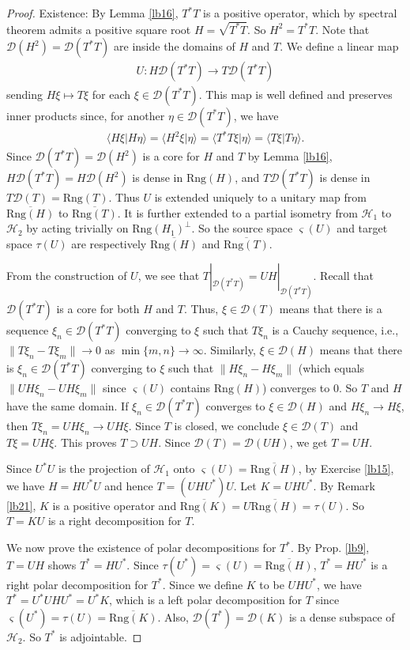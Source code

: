 \documentclass[12pt,a4paper,notitlepage]{article}
\theoremstyle{definition}
\theoremstyle{plain}
\newcommand{\mc}{\mathcal}
\newcommand{\ovl}{\overline}
\newcommand{\Dom}{\scr D}
\newcommand{\bk}[1]{\langle {#1}\rangle}
\newcommand{\scr}{\mathscr}
\newcommand{\sgm}{\varsigma}
\newcommand{\Rng}{\mathrm{Rng}}
\numberwithin{equation}{section}
\begin{document}
\begin{proof}
Existence: By Lemma \ref{lb16}, $T^*T$ is a positive operator,  which by spectral theorem admits a positive square root $H=\sqrt{T^*T}$. So $H^2=T^*T$. Note that $\Dom(H^2)=\Dom(T^*T)$ are inside the domains of $H$ and $T$. We define a linear map
\begin{align*}
U:H\Dom(T^*T)\rightarrow T\Dom(T^*T)	
\end{align*}
sending $H\xi\mapsto T\xi$ for each $\xi\in\Dom(T^*T)$. This map is well defined and preserves inner products since, for another $\eta\in\Dom(T^*T)$, we have
\begin{align*}
\bk{H\xi|H\eta}=\bk{H^2\xi|\eta}=\bk{T^*T\xi|\eta}=\bk{T\xi|T\eta}.	
\end{align*}
Since $\Dom(T^*T)=\Dom(H^2)$ is a core for $H$ and $T$ by Lemma \ref{lb16}, $H\Dom(T^*T)=H\Dom(H^2)$ is dense in $\Rng(H)$, and $T\Dom(T^*T)$ is dense in $T\Dom(T)=\Rng(T)$. Thus $U$ is extended uniquely to a unitary map from $\ovl{\Rng(H)}$ to $\ovl{\Rng(T)}$.	It is further extended to a partial isometry from $\mc H_1$ to $\mc H_2$ by acting trivially on $\Rng(H_1)^\perp$. So the source space $\sgm(U)$ and target space $\tau(U)$ are respectively $\ovl{\Rng(H)}$ and $\ovl{\Rng(T)}$.

From  the construction of $U$, we see that $T|_{\Dom(T^*T)}=UH|_{\Dom(T^*T)}$. Recall that $\Dom(T^*T)$ is a core for both $H$ and $T$. Thus, $\xi\in\Dom(T)$ means that there is a sequence $\xi_n\in\Dom(T^*T)$ converging to $\xi$ such that $T\xi_n$ is a Cauchy sequence, i.e., $\lVert T\xi_n-T\xi_m\lVert\rightarrow 0$ as $\min\{m,n\}\rightarrow \infty$. Similarly, $\xi\in\Dom(H)$ means that there is $\xi_n\in\Dom(T^*T)$ converging to $\xi$ such that $\lVert H\xi_n-H\xi_m\lVert$ (which equals $\lVert UH\xi_n-UH\xi_m\lVert$ since $\sgm(U)$ contains $\Rng(H)$) converges to $0$. So $T$ and $H$ have the same domain. If $\xi_n\in\Dom(T^*T)$ converges to $\xi\in\Dom(H)$ and $H\xi_n\rightarrow H\xi$, then $T\xi_n=UH\xi_n\rightarrow UH\xi$. Since $T$ is closed, we conclude $\xi\in\Dom(T)$ and $T\xi=UH\xi$. This proves $T\supset UH$. Since $\Dom(T)=\Dom(UH)$, we get $T=UH$.

Since $U^*U$ is the projection of $\mc H_1$ onto $\sgm(U)=\ovl{\Rng(H)}$, by Exercise \ref{lb15}, we have $H=HU^*U$ and hence $T=(UHU^*)U$. Let $K=UHU^*$. By Remark \ref{lb21}, $K$ is a positive operator and $\ovl{\Rng(K)}=U\ovl{\Rng(H)}=\tau(U)$. So $T=KU$ is a right decomposition for $T$.

We now prove the existence of polar decompositions for $T^*$. By Prop. \ref{lb9}, $T=UH$ shows $T^*=HU^*$. Since $\tau(U^*)=\sgm(U)=\ovl{\Rng(H)}$, $T^*=HU^*$ is a right polar decomposition for $T^*$. Since we define $K$ to be $UHU^*$, we have $T^*=U^*UHU^*=U^*K$, which is a left polar decomposition for $T$ since $\sgm(U^*)=\tau(U)=\ovl{\Rng(K)}$. Also, $\Dom(T^*)=\Dom(K)$ is a dense subspace of $\mc H_2$. So $T^*$ is adjointable.


\end{proof}
\end{document}
